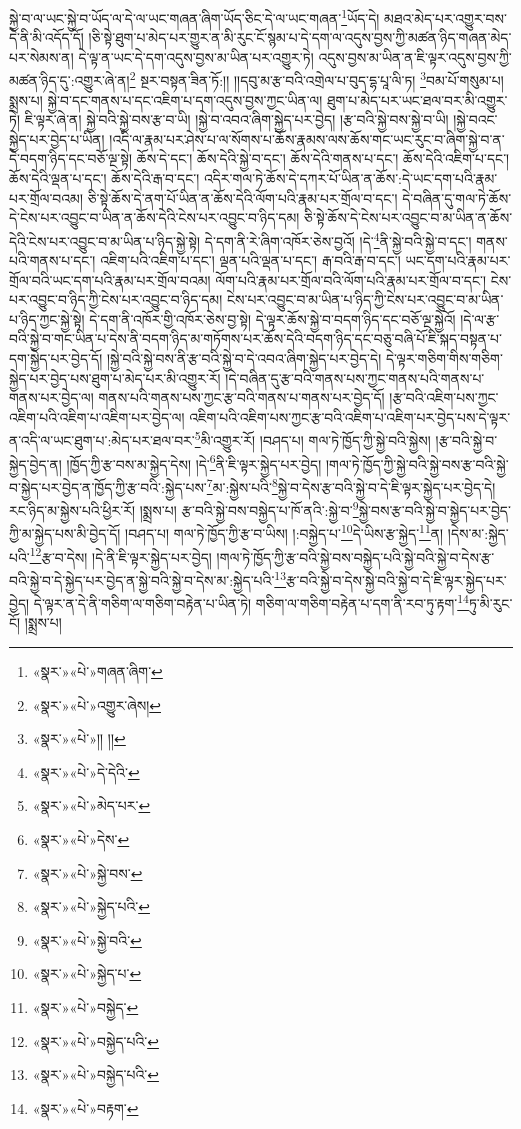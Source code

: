 སྐྱེ་བ་ལ་ཡང་སྐྱེ་བ་ཡོད་ལ་དེ་ལ་ཡང་གཞན་ཞིག་ཡོད་ཅིང་དེ་ལ་ཡང་གཞན་\footnote{«སྣར་»«པེ་»གཞན་ཞིག་}ཡོད་དེ། མཐའ་མེད་པར་འགྱུར་བས་དེ་ནི་མི་འདོད་དོ། །ཅི་སྟེ་ཐུག་པ་མེད་པར་གྱུར་ན་མི་རུང་ངོ་སྙམ་པ་དེ་དག་ལ་འདུས་བྱས་ཀྱི་མཚན་ཉིད་གཞན་མེད་པར་སེམས་ན། དེ་ལྟ་ན་ཡང་དེ་དག་འདུས་བྱས་མ་ཡིན་པར་འགྱུར་ཏེ། འདུས་བྱས་མ་ཡིན་ན་ཇི་ལྟར་འདུས་བྱས་ཀྱི་མཚན་ཉིད་དུ་:འགྱུར་ཞེ་ན།\footnote{«སྣར་»«པེ་»འགྱུར་ཞེས།} སྔར་བསྟན་ཟིན་ཏོ:།། །།དབུ་མ་རྩ་བའི་འགྲེལ་པ་བུད་དྷ་པཱ་ལི་ཏ། \footnote{«སྣར་»«པེ་»།། །། }བམ་པོ་གསུམ་པ། སྨྲས་པ། སྐྱེ་བ་དང་གནས་པ་དང་འཇིག་པ་དག་འདུས་བྱས་ཀྱང་ཡིན་ལ། ཐུག་པ་མེད་པར་ཡང་ཐལ་བར་མི་འགྱུར་ཏེ། ཇི་ལྟར་ཞེ་ན། སྐྱེ་བའི་སྐྱེ་བས་རྩ་བ་ཡི། །སྐྱེ་བ་འབའ་ཞིག་སྐྱེད་པར་བྱེད། །རྩ་བའི་སྐྱེ་བས་སྐྱེ་བ་ཡི། །སྐྱེ་བའང་སྐྱེད་པར་བྱེད་པ་ཡིན། །འདི་ལ་རྣམ་པར་ཤེས་པ་ལ་སོགས་པ་ཆོས་རྣམས་ལས་ཆོས་གང་ཡང་རུང་བ་ཞིག་སྐྱེ་བ་ན་དེ་བདག་ཉིད་དང་བཅོ་ལྔ་སྟེ། ཆོས་དེ་དང་། ཆོས་དེའི་སྐྱེ་བ་དང་། ཆོས་དེའི་གནས་པ་དང་། ཆོས་དེའི་འཇིག་པ་དང་། ཆོས་དེའི་ལྡན་པ་དང་། ཆོས་དེའི་རྒ་བ་དང་། འདིར་གལ་ཏེ་ཆོས་དེ་དཀར་པོ་ཡིན་ན་ཆོས་:དེ་ཡང་དག་པའི་རྣམ་པར་གྲོལ་བའམ། ཅི་སྟེ་ཆོས་དེ་ནག་པོ་ཡིན་ན་ཆོས་དེའི་ལོག་པའི་རྣམ་པར་གྲོལ་བ་དང་། དེ་བཞིན་དུ་གལ་ཏེ་ཆོས་དེ་ངེས་པར་འབྱུང་བ་ཡིན་ན་ཆོས་དེའི་ངེས་པར་འབྱུང་བ་ཉིད་དམ། ཅི་སྟེ་ཆོས་དེ་ངེས་པར་འབྱུང་བ་མ་ཡིན་ན་ཆོས་དེའི་ངེས་པར་འབྱུང་བ་མ་ཡིན་པ་ཉིད་སྐྱེ་སྟེ། དེ་དག་ནི་རེ་ཞིག་འཁོར་ཅེས་བྱའོ། །དེ་\footnote{«སྣར་»«པེ་»དེ་དེའི་}ནི་སྐྱེ་བའི་སྐྱེ་བ་དང་། གནས་པའི་གནས་པ་དང་། འཇིག་པའི་འཇིག་པ་དང་། ལྡན་པའི་ལྡན་པ་དང་། རྒ་བའི་རྒ་བ་དང་། ཡང་དག་པའི་རྣམ་པར་གྲོལ་བའི་ཡང་དག་པའི་རྣམ་པར་གྲོལ་བའམ། ལོག་པའི་རྣམ་པར་གྲོལ་བའི་ལོག་པའི་རྣམ་པར་གྲོལ་བ་དང་། ངེས་པར་འབྱུང་བ་ཉིད་ཀྱི་ངེས་པར་འབྱུང་བ་ཉིད་དམ། ངེས་པར་འབྱུང་བ་མ་ཡིན་པ་ཉིད་ཀྱི་ངེས་པར་འབྱུང་བ་མ་ཡིན་པ་ཉིད་ཀྱང་སྐྱེ་སྟེ། དེ་དག་ནི་འཁོར་གྱི་འཁོར་ཅེས་བྱ་སྟེ། དེ་ལྟར་ཆོས་སྐྱེ་བ་བདག་ཉིད་དང་བཅོ་ལྔ་སྐྱེའོ། །དེ་ལ་རྩ་བའི་སྐྱེ་བ་གང་ཡིན་པ་དེས་ནི་བདག་ཉིད་མ་གཏོགས་པར་ཆོས་དེའི་བདག་ཉིད་དང་བཅུ་བཞི་པོ་ཇི་སྐད་བསྟན་པ་དག་སྐྱེད་པར་བྱེད་དོ། །སྐྱེ་བའི་སྐྱེ་བས་ནི་རྩ་བའི་སྐྱེ་བ་དེ་འབའ་ཞིག་སྐྱེད་པར་བྱེད་དེ། དེ་ལྟར་གཅིག་གིས་གཅིག་སྐྱེད་པར་བྱེད་པས་ཐུག་པ་མེད་པར་མི་འགྱུར་རོ། །དེ་བཞིན་དུ་རྩ་བའི་གནས་པས་ཀྱང་གནས་པའི་གནས་པ་གནས་པར་བྱེད་ལ། གནས་པའི་གནས་པས་ཀྱང་རྩ་བའི་གནས་པ་གནས་པར་བྱེད་དོ། །རྩ་བའི་འཇིག་པས་ཀྱང་འཇིག་པའི་འཇིག་པ་འཇིག་པར་བྱེད་ལ། འཇིག་པའི་འཇིག་པས་ཀྱང་རྩ་བའི་འཇིག་པ་འཇིག་པར་བྱེད་པས་དེ་ལྟར་ན་འདི་ལ་ཡང་ཐུག་པ་:མེད་པར་ཐལ་བར་\footnote{«སྣར་»«པེ་»མེད་པར་}མི་འགྱུར་རོ། །བཤད་པ། གལ་ཏེ་ཁྱོད་ཀྱི་སྐྱེ་བའི་སྐྱེས། །རྩ་བའི་སྐྱེ་བ་སྐྱེད་བྱེད་ན། །ཁྱོད་ཀྱི་རྩ་བས་མ་སྐྱེད་དེས། །དེ་\footnote{«སྣར་»«པེ་»དེས་}ནི་ཇི་ལྟར་སྐྱེད་པར་བྱེད། །གལ་ཏེ་ཁྱོད་ཀྱི་སྐྱེ་བའི་སྐྱེ་བས་རྩ་བའི་སྐྱེ་བ་སྐྱེད་པར་བྱེད་ན་ཁྱོད་ཀྱི་རྩ་བའི་:སྐྱེད་པས་\footnote{«སྣར་»«པེ་»སྐྱེ་བས་}མ་:སྐྱེས་པའི་\footnote{«སྣར་»«པེ་»སྐྱེད་པའི་}སྐྱེ་བ་དེས་རྩ་བའི་སྐྱེ་བ་དེ་ཇི་ལྟར་སྐྱེད་པར་བྱེད་དེ། རང་ཉིད་མ་སྐྱེས་པའི་ཕྱིར་རོ། །སྨྲས་པ། རྩ་བའི་སྐྱེ་བས་བསྐྱེད་པ་ཁོ་ནའི་:སྐྱེ་བ་\footnote{«སྣར་»«པེ་»སྐྱེ་བའི་}སྐྱེ་བས་རྩ་བའི་སྐྱེ་བ་སྐྱེད་པར་བྱེད་ཀྱི་མ་སྐྱེད་པས་མི་བྱེད་དོ། །བཤད་པ། གལ་ཏེ་ཁྱོད་ཀྱི་རྩ་བ་ཡིས། །:བསྐྱེད་པ་\footnote{«སྣར་»«པེ་»སྐྱེད་པ་}དེ་ཡིས་རྩ་སྐྱེད་\footnote{«སྣར་»«པེ་»བསྐྱེད་}ན། །དེས་མ་:སྐྱེད་པའི་\footnote{«སྣར་»«པེ་»བསྐྱེད་པའི་}རྩ་བ་དེས། །དེ་ནི་ཇི་ལྟར་སྐྱེད་པར་བྱེད། །གལ་ཏེ་ཁྱོད་ཀྱི་རྩ་བའི་སྐྱེ་བས་བསྐྱེད་པའི་སྐྱེ་བའི་སྐྱེ་བ་དེས་རྩ་བའི་སྐྱེ་བ་དེ་སྐྱེད་པར་བྱེད་ན་སྐྱེ་བའི་སྐྱེ་བ་དེས་མ་:སྐྱེད་པའི་\footnote{«སྣར་»«པེ་»བསྐྱེད་པའི་}རྩ་བའི་སྐྱེ་བ་དེས་སྐྱེ་བའི་སྐྱེ་བ་དེ་ཇི་ལྟར་སྐྱེད་པར་བྱེད། དེ་ལྟར་ན་དེ་ནི་གཅིག་ལ་གཅིག་བརྟེན་པ་ཡིན་ཏེ། གཅིག་ལ་གཅིག་བརྟེན་པ་དག་ནི་རབ་ཏུ་རྟག་\footnote{«སྣར་»«པེ་»བརྟག་}ཏུ་མི་རུང་ངོ། །སྨྲས་པ། 